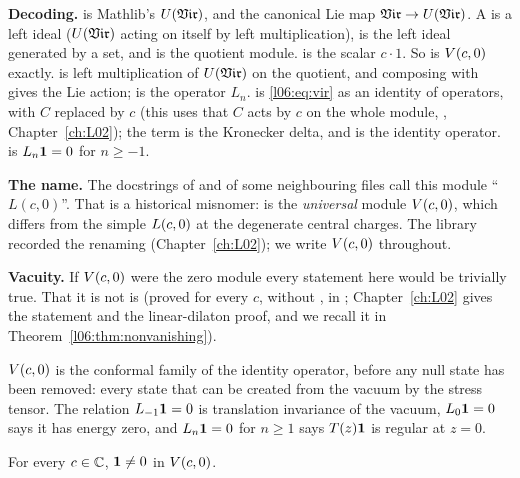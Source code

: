 \begin{dictionary}
\textbf{Decoding.}  is Mathlib's $U(\mathfrak{Vir})$, and 
the canonical Lie map $\mathfrak{Vir}\to U(\mathfrak{Vir})$. A  is a left ideal ($U(\mathfrak{Vir})$
acting on itself by left multiplication),  is the left ideal generated by a set,
and  is the quotient module.  is the scalar $c\cdot1$. So
 is $V(c,0)$ exactly.  is left multiplication of $U(\mathfrak{Vir})$ on the
quotient, and composing with  gives the Lie action;  is the operator $L_n$.
 is \eqref{l06:eq:vir} as an identity of operators, with $C$ replaced by $c$ (this
uses that $C$ acts by $c$ on the whole module, , Chapter~\ref{ch:L02}); the term
 is the Kronecker delta, and  is the
identity operator.  is $L_n\mathbf{1} = 0$ for $n\ge-1$.

\textbf{The name.} The docstrings of  and of some neighbouring files call
this module ``$L(c,0)$''. That is a historical misnomer:  is the \emph{universal}
module $V(c,0)$, which differs from the simple $L(c,0)$ at the degenerate central charges. The
library recorded the renaming (Chapter~\ref{ch:L02}); we write $V(c,0)$ throughout.

\textbf{Vacuity.} If $V(c,0)$ were the zero module every statement here would be trivially true. That
it is not is  (proved for every $c$, without ,
in ; Chapter~\ref{ch:L02} gives the statement and the
linear-dilaton proof, and we recall it in Theorem~\ref{l06:thm:nonvanishing}).
\end{dictionary}

\begin{physics}
$V(c,0)$ is the conformal family of the identity operator, before any null state has been removed:
every state that can be created from the vacuum by the stress tensor. The relation $L_{-1}\mathbf{1} = 0$
is translation invariance of the vacuum, $L_0\mathbf{1} = 0$ says it has energy zero, and $L_n\mathbf{1} = 0$
for $n\ge1$ says $T(z)\mathbf{1}$ is regular at $z = 0$.
\end{physics}

\begin{theorem}\label{l06:thm:nonvanishing}
For every $c\in{\mathbb{C}}$, $\mathbf{1}\ne0$ in $V(c,0)$.
\end{theorem}

